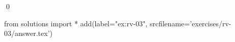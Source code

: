 
\begin{ex} 
  \label{ex:rv-03}
  
  \qed
\end{ex} 
\begin{python0}
from solutions import *
add(label="ex:rv-03",
    srcfilename='exercises/rv-03/answer.tex') 
\end{python0}
